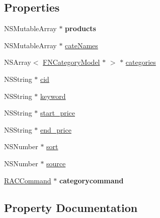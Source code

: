\subsection*{Properties}
\begin{DoxyCompactItemize}
\item 
\mbox{\label{interface_f_n_partner_goods_view_model_ad608dece2bae576ede4ff661d7ec6c55}} 
N\+S\+Mutable\+Array $\ast$ {\bfseries products}
\item 
N\+S\+Mutable\+Array $\ast$ \mbox{\hyperlink{interface_f_n_partner_goods_view_model_a733cf11fcd09bea118efa831ab4b9f77}{cate\+Names}}
\item 
N\+S\+Array$<$ \mbox{\hyperlink{interface_f_n_category_model}{F\+N\+Category\+Model}} $\ast$ $>$ $\ast$ \mbox{\hyperlink{interface_f_n_partner_goods_view_model_ade8fa63fffc3790e3fe69b3b95d4faed}{categories}}
\item 
N\+S\+String $\ast$ \mbox{\hyperlink{interface_f_n_partner_goods_view_model_ab660cca6b83996aef15a6dee340529fa}{cid}}
\item 
N\+S\+String $\ast$ \mbox{\hyperlink{interface_f_n_partner_goods_view_model_aa8ab181196dfb99e80ff535d3ab178fa}{keyword}}
\item 
N\+S\+String $\ast$ \mbox{\hyperlink{interface_f_n_partner_goods_view_model_a4c03042908d4931615fb14851f5f3c80}{start\+\_\+price}}
\item 
N\+S\+String $\ast$ \mbox{\hyperlink{interface_f_n_partner_goods_view_model_a69a840fedb8d20c83eab78eb9e8ac4d2}{end\+\_\+price}}
\item 
N\+S\+Number $\ast$ \mbox{\hyperlink{interface_f_n_partner_goods_view_model_a2c1d7759b6aa8b9e6915147d1c077260}{sort}}
\item 
N\+S\+Number $\ast$ \mbox{\hyperlink{interface_f_n_partner_goods_view_model_a910bfc3a1707f179dc50776655c839a6}{source}}
\item 
\mbox{\label{interface_f_n_partner_goods_view_model_aa0108d53f74ae9e0ad71ebf567cc6605}} 
\mbox{\hyperlink{interface_r_a_c_command}{R\+A\+C\+Command}} $\ast$ {\bfseries categorycommand}
\end{DoxyCompactItemize}


\subsection{Property Documentation}
\mbox{\label{interface_f_n_partner_goods_view_model_ade8fa63fffc3790e3fe69b3b95d4faed}} 
